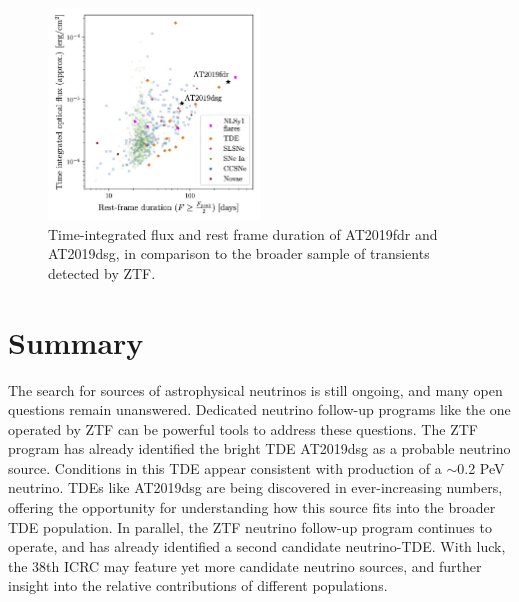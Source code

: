 \documentclass[a4paper,11pt]{article}
\begin{document}
\begin{figure}[!ht]
	\centering
	\includegraphics[width=0.5\textwidth]{figures/ztf_transients}
	\caption{Time-integrated flux and rest frame duration of AT2019fdr and AT2019dsg, in comparison to the broader sample of transients detected by ZTF. }
	\label{fig:ztf_transients}
\end{figure}

\section{Summary}

The search for sources of astrophysical neutrinos is still ongoing, and many open questions remain unanswered. Dedicated neutrino follow-up programs like the one operated by ZTF can be powerful tools to address these questions. The ZTF program has already identified the bright TDE AT2019dsg as a probable neutrino source. Conditions in this TDE appear consistent with production of a $\sim$0.2 PeV neutrino. TDEs like AT2019dsg are being discovered in ever-increasing numbers, offering the opportunity for understanding how this source fits into the broader TDE population. In parallel, the ZTF neutrino follow-up program continues to operate, and has already identified a second candidate neutrino-TDE. With luck, the 38th ICRC may feature yet more candidate neutrino sources, and further insight into the relative contributions of different populations.





%
\end{document}
